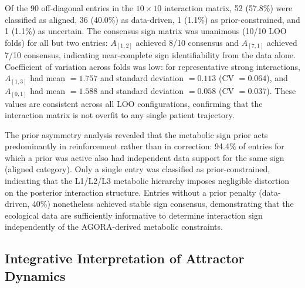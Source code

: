 Of the 90 off-diagonal entries in the $10 \times 10$ interaction matrix, 52 (57.8\%) were classified as aligned, 36 (40.0\%) as data-driven, 1 (1.1\%) as prior-constrained, and 1 (1.1\%) as uncertain. The consensus sign matrix was unanimous (10/10 LOO folds) for all but two entries: $A_{[1,2]}$ achieved 8/10 consensus and $A_{[7,1]}$ achieved 7/10 consensus, indicating near-complete sign identifiability from the data alone. Coefficient of variation across folds was low: for representative strong interactions, $A_{[1,3]}$ had mean $= 1.757$ and standard deviation $= 0.113$ (CV $= 0.064$), and $A_{[0,1]}$ had mean $= 1.588$ and standard deviation $= 0.058$ (CV $= 0.037$). These values are consistent across all LOO configurations, confirming that the interaction matrix is not overfit to any single patient trajectory.

The prior asymmetry analysis revealed that the metabolic sign prior acts predominantly in reinforcement rather than in correction: 94.4\% of entries for which a prior was active also had independent data support for the same sign (aligned category). Only a single entry was classified as prior-constrained, indicating that the L1/L2/L3 metabolic hierarchy imposes negligible distortion on the posterior interaction structure. Entries without a prior penalty (data-driven, 40\%) nonetheless achieved stable sign consensus, demonstrating that the ecological data are sufficiently informative to determine interaction sign independently of the AGORA-derived metabolic constraints.

\subsection{Integrative Interpretation of Attractor Dynamics}

